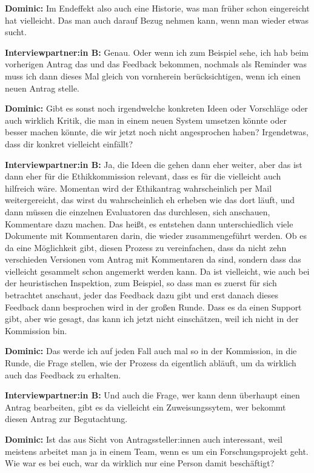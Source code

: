 \documentclass[a4paper,12pt,twoside]{scrreprt}
\begin{document}
\textbf{Dominic:} Im Endeffekt also auch eine Historie, was man früher schon eingereicht hat vielleicht. Das man auch darauf Bezug nehmen kann, wenn man wieder etwas sucht.

\textbf{Interviewpartner:in B:} Genau. Oder wenn ich zum Beispiel sehe, ich hab beim vorherigen Antrag das und das Feedback bekommen, nochmals als Reminder was muss ich dann dieses Mal gleich von vornherein berücksichtigen, wenn ich einen neuen Antrag stelle.

\textbf{Dominic:} Gibt es sonst noch irgendwelche konkreten Ideen oder Vorschläge oder auch wirklich Kritik, die man in einem neuen System umsetzen könnte oder besser machen könnte, die wir jetzt noch nicht angesprochen haben? Irgendetwas, dass dir konkret vielleicht einfällt?

\textbf{Interviewpartner:in B:} Ja, die Ideen die gehen dann eher weiter, aber das ist dann eher für die Ethikkommission relevant, dass es für die vielleicht auch hilfreich wäre. Momentan wird der Ethikantrag wahrscheinlich per Mail weitergereicht, das wirst du wahrscheinlich eh erheben wie das dort läuft, und dann müssen die einzelnen Evaluatoren das durchlesen, sich anschauen, Kommentare dazu machen. Das heißt, es entstehen dann unterschiedlich viele Dokumente mit Kommentaren darin, die wieder zusammengeführt werden. Ob es da eine Möglichkeit gibt, diesen Prozess zu vereinfachen, dass da nicht zehn verschieden Versionen vom Antrag mit Kommentaren da sind, sondern dass das vielleicht gesammelt schon angemerkt werden kann. Da ist vielleicht, wie auch bei der heuristischen Inspektion, zum Beispiel, so dass man es zuerst für sich betrachtet anschaut, jeder das Feedback dazu gibt und erst danach dieses Feedback dann besprochen wird in der großen Runde. Dass es da einen Support gibt, aber wie gesagt, das kann ich jetzt nicht einschätzen, weil ich nicht in der Kommission bin.

\textbf{Dominic:} Das werde ich auf jeden Fall auch mal so in der Kommission, in die Runde, die Frage stellen, wie der Prozess da eigentlich abläuft, um da wirklich auch das Feedback zu erhalten.

\textbf{Interviewpartner:in B:} Und auch die Frage, wer kann denn überhaupt einen Antrag bearbeiten, gibt es da vielleicht ein Zuweisungssytem, wer bekommt diesen Antrag zur Begutachtung.

\textbf{Dominic:} Ist das aus Sicht von Antragssteller:innen auch interessant, weil meistens arbeitet man ja in einem Team, wenn es um ein Forschungsprojekt geht. Wie war es bei euch, war da wirklich nur eine Person damit beschäftigt?
\end{document}
